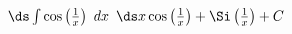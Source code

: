 {$\ds \int \cos\left(\frac1x\right)\ dx$}
{$\ds x\cos\left(\frac1x\right) +\Si\left(\frac1x\right) +C$
}

